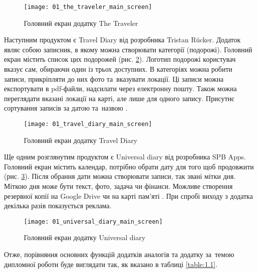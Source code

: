 \documentclass[../main.tex]{subfiles}
\begin{document}
{\begin{figure}[H]
	\centering
	\texttt{[image: 01\_the\_traveler\_main\_screen]}
	\caption{Головний екран додатку The Traveler}
	\label{figure:1.2}
\end{figure}

Наступним продуктом є Travel Diary від розробника Tristan Rücker. Додаток являє собою записник, в якому можна створювати категорії (подорожі). Головний екран містить список цих подорожей (рис. \ref{figure:1.3}). Логотип подорожі користувач вказує сам, обираючи один із трьох доступних. В категоріях можна робити записи, прикріпляти до них фото та~вказувати локації. Ці записи можна експортувати в pdf-файли, надсилати через електронну пошту. Також можна переглядати вказані локації на карті, але лише для одного запису. Присутнє сортування записів за датою та~назвою \cite{travel_diary_app}.

\begin{figure}[H]
\centering
\texttt{[image: 01\_travel\_diary\_main\_screen]}
\caption{Головний екран додатку Travel Diary}
\label{figure:1.3}
\end{figure}

Ще одним розглянутим продуктом є Universal diary від розробника SPB Apps. Головний екран містить календар, потрібно обрати дату для того щоб продовжити (рис. \ref{figure:1.4}). Після обрання дати можна створювати записи, так звані мітки дня. Міткою дня може бути текст, фото, задача чи фінанси. Можливе створення резервної копії на Google Drive чи на карті пам'яті \cite{universal_diary_app}. При спробі виходу з додатка декілька разів показується реклама.

\begin{figure}[H]
\centering
\texttt{[image: 01\_universal\_diary\_main\_screen]}
\caption{Головний екран додатку Universal diary}
\label{figure:1.4}
\end{figure}

Отже, порівняння основних функцій додатків аналогів та додатку за~темою дипломної роботи буде виглядати так, як вказано в таблиці \ref{table:1.1}.

}
\end{document}
